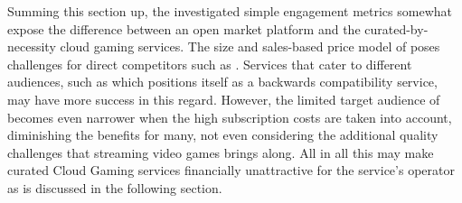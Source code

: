 Summing this section up, the investigated simple engagement metrics somewhat expose the difference between an open market platform and the curated-by-necessity cloud gaming services. The size and sales-based price model of \steam poses challenges for direct competitors such as \gfnow. Services that cater to different audiences, such as \psnow which positions itself as a backwards compatibility service, may have more success in this regard. However, the limited target audience of \psnow becomes even narrower when the high subscription costs are taken into account, diminishing the benefits for many, not even considering the additional quality challenges that streaming video games brings along. All in all this may make curated Cloud Gaming services financially unattractive for the service's operator as is discussed in the following section.














